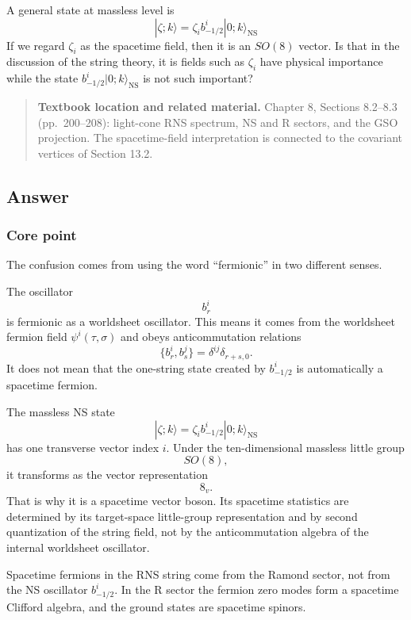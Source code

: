 \documentclass[
  10pt,
  a4paper,
  openany]{book}
\begin{document}
A general state at massless level is \[
|\zeta;k\rangle
=
\zeta_i b_{-1/2}^i|0;k\rangle_{\text{NS}}
\] If we regard \(\zeta_{i}\) as the spacetime field, then it is an
\(SO(8)\) vector. Is that in the discussion of the string theory, it is
fields such as \(\zeta_{i}\) have physical importance while the state
\(b_{-1/2}^i|0;k\rangle_{\text{NS}}\) is not such important?

\begin{quote}
\textbf{Textbook location and related material.} Chapter 8, Sections
8.2--8.3 (pp.~200--208): light-cone RNS spectrum, NS and R sectors, and
the GSO projection. The spacetime-field interpretation is connected to
the covariant vertices of Section 13.2.
\end{quote}

\subsection{Answer}\label{answer-13}

\subsubsection{Core point}\label{core-point-13}

The confusion comes from using the word ``fermionic'' in two different
senses.

The oscillator \[
b_r^i
\] is fermionic as a worldsheet oscillator. This means it comes from the
worldsheet fermion field \(\psi^i(\tau,\sigma)\) and obeys
anticommutation relations \[
\{b_r^i,b_s^j\}
=
\delta^{ij}\delta_{r+s,0}.
\] It does not mean that the one-string state created by \(b_{-1/2}^i\)
is automatically a spacetime fermion.

The massless NS state \[
|\zeta;k\rangle
=
\zeta_i b_{-1/2}^i|0;k\rangle_{\text{NS}}
\] has one transverse vector index \(i\). Under the ten-dimensional
massless little group \[
SO(8),
\] it transforms as the vector representation \[
8_v.
\] That is why it is a spacetime vector boson. Its spacetime statistics
are determined by its target-space little-group representation and by
second quantization of the string field, not by the anticommutation
algebra of the internal worldsheet oscillator.

Spacetime fermions in the RNS string come from the Ramond sector, not
from the NS oscillator \(b_{-1/2}^i\). In the R sector the fermion zero
modes form a spacetime Clifford algebra, and the ground states are
spacetime spinors.
\end{document}
